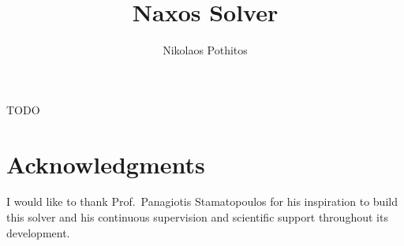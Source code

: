 \documentclass[a4paper]{article}
\begin{document}
\title{Naxos Solver}

\author{Nikolaos Pothitos}


\date{}

\maketitle

\noindent
TODO

\section*{Acknowledgments}

I would like to thank Prof.\ Panagiotis Stamatopoulos for
his inspiration to build this solver and his continuous
supervision and scientific support throughout its
development.


\end{document}
